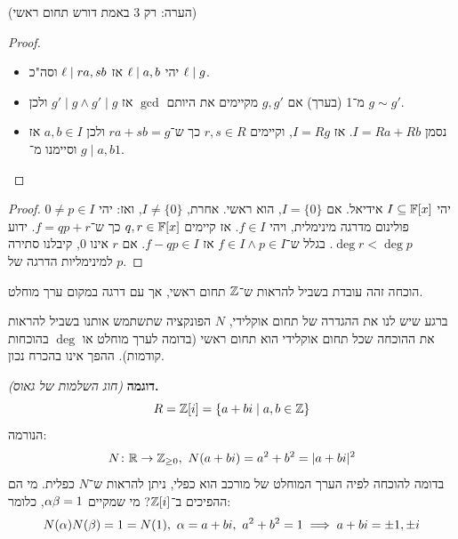 \documentclass[]{../../../../tex/classes/styledArticle}
\begin{document}
(הערה: רק 3 באמת דורש תחום ראשי)
	\begin{proof}
		\begin{itemize}
			\item יהי $\ell \mid a, b$ אז $\ell \mid ra, sb$ וסה"כ $\ell \mid g$. 
			\item מ־1 (בערך) אם $g, g'$ מקיימים את היותם $\gcd$ אז $g' \mid g \land g' \mid g$ ולכן $g \sim g'$. 
			\item נסמן $I = Ra + Rb$. אז $I = Rg$, וקיימים $r, s \in R$ כך ש־$ra + sb = g$ ולכן $a, b \in I$ אז $g \mid a, b$ וסיימנו מ־$1$. 
		\end{itemize}
	\end{proof}
	\begin{proof}
		יהי $I \subseteq \mathbb{F}[x]$ אידיאל. אם $I = \{0\}$, הוא ראשי. אחרת, $I \neq \{0\}$, ואז: יהי $0 \neq p \in I$ פולינום מדרגה מינימלית, ויהי $f \in I$. אז קיימים $q, r \in \mathbb{F}[x]$ כך ש־$f = qp + r$. ידוע $\deg r < \deg p$. בגלל ש־$f \in I \land p \in I$ אז $f - qp \in I$. אם $r$ אינו $0$, קיבלנו סתירה למינימליות הדרגה של $p$. 
	\end{proof}
	הוכחה זהה עובדת בשביל להראות ש־$\mathbb{Z}$ תחום ראשי, אך עם דרגה במקום ערך מוחלט. 
	
	ברגע שיש לנו את ההגדרה של תחום אוקלידי, $N$ הפונקציה שתשתמש אותנו בשביל להראות את ההוכחה שכל תחום אוקלידי הוא תחום ראשי (בדומה לערך מוחלט או $\deg$ בהוכחות קודמות). ההפך אינו בהכרח נכון. 
	
	
	\textbf{דוגמה }\textit{(חוג השלמות של גאוס)}\textbf{. }
	\[ R = \mathbb{Z}[i] = \{a + bi \mid a, b \in \mathbb{Z}\} \]
	הנורמה: 
	\[ N \colon \mathbb{R}\to \mathbb{Z}_{\ge 0}, \ N(a + bi) = a^2 + b^2 = |a + bi|^2 \]
	בדומה להוכחה לפיה הערך המוחלט של מורכב הוא כפלי, ניתן להראות ש־$N$ כפלית. מי הם ההפיכים ב־$\mathbb{Z}[i]$? מי שמקיים $\alpha \beta = 1$, כלומר: 
	\[ N(\alpha)N(\beta) = 1 = N(1), \ \alpha = a + bi, \ a^2 + b^2 = 1 \implies a + bi = \pm 1, \pm i \]
	
\end{document}
